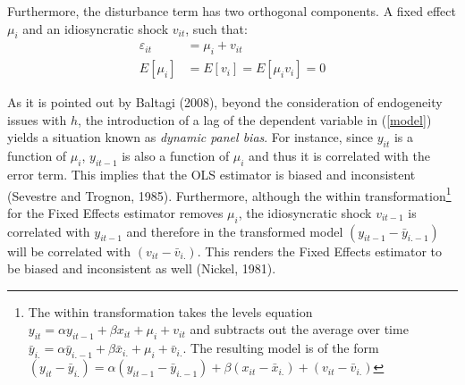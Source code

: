 \documentclass[12pt,a4paper,english]{article}%
\begin{document}
Furthermore, the disturbance term has two orthogonal components. A fixed effect $\mu _{i}$ and an idiosyncratic shock $v_{it}$, such that:
\begin{equation}
\label{ass_errors}
\begin{aligned}
\varepsilon_{it}&=\mu _{i}+v_{it}\\
E\left[\mu_{i}\right]&=E\left[v_{i}\right]=E\left[\mu_{i}v_i\right]=0
\end{aligned}
\end{equation}

As it is pointed out by Baltagi (2008), beyond the consideration of  endogeneity issues with $h$, the introduction of a lag of the dependent variable in (\ref{model}) yields a situation known as  \emph{dynamic panel bias}. For instance, since $y_{it}$ is a function of $\mu_{i}$, $y_{it-1}$ is also a function of $\mu_{i}$ and thus it is correlated with the error term. This implies that the OLS estimator is biased and inconsistent (Sevestre and Trognon, 1985). Furthermore, although the within transformation\footnote{The within transformation takes the levels equation $y_{it}=\alpha y_{it-1} + \beta x_{it} + \mu_i+v_{it}$ and subtracts out the average over time $\bar y_{i.}=\alpha \bar y_{i.-1} + \beta \bar x_{i.}+\mu_i +\bar v_{i.}$. The resulting model is of the form $(y_{it}-\bar y_{i.})=\alpha (y_{it-1}-\bar y_{i.-1})+ \beta (x_{it}-\bar x_{i.}) +(v_{it}-\bar v_{i.})$} for the Fixed Effects estimator removes $\mu_{i}$, the idiosyncratic shock $v_{it-1}$ is correlated with $y_{it-1}$ and therefore in the transformed model $(y_{it-1}-\bar y_{i.-1})$ will be correlated with $(v_{it}-\bar v_{i.})$. This renders the Fixed Effects estimator to be biased and inconsistent as well (Nickel, 1981).
\end{document}
